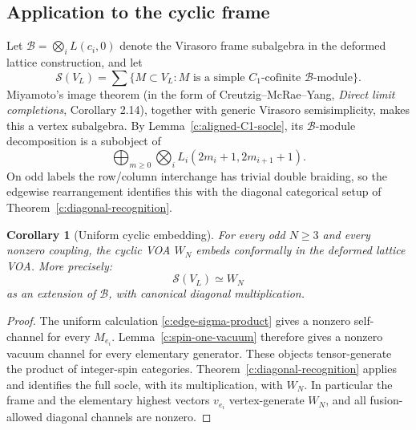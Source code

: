 \documentclass[11pt,a4paper]{article}
\numberwithin{equation}{section}
\newtheorem{corollary}[theorem]{Corollary}
\theoremstyle{definition}\newtheorem{definition}[theorem]{Definition}
\theoremstyle{remark}\newtheorem{remark}[theorem]{Remark}
\begin{document}
\subsection{Application to the cyclic frame}

Let $\mathcal B=\bigotimes_i L(c_i,0)$ denote the Virasoro frame subalgebra
in the deformed lattice construction, and let
\[
 \mathscr S(V_L)=\sum\{M\subset V_L:
              M\text{ is a simple }C_1\text{-cofinite }\mathcal B\text{-module}\}.
\]
Miyamoto's image theorem (in the form of Creutzig--McRae--Yang,
\emph{Direct limit completions}, Corollary 2.14), together with generic
Virasoro semisimplicity, makes this a vertex subalgebra.  By Lemma~\ref{c:aligned-C1-socle},
its $\mathcal B$-module decomposition is a subobject of
\[
 \bigoplus_{m\geq0}\bigotimes_i
                L_i(2m_i+1,2m_{i+1}+1).
\]
On odd labels the row/column interchange has trivial double braiding, so
the edgewise rearrangement identifies this with the diagonal categorical
setup of Theorem~\ref{c:diagonal-recognition}.

\begin{corollary}[Uniform cyclic embedding]\label{c:cyclic-embedding}
For every odd $N\geq3$ and every nonzero coupling, the cyclic VOA
$W_N$ embeds conformally in the deformed lattice VOA. More precisely:
\[
 \mathscr S(V_L)\simeq W_N
\]
as an extension of $\mathcal B$, with canonical diagonal multiplication.
\end{corollary}
\begin{proof}
The uniform calculation \eqref{c:edge-sigma-product} gives a nonzero
self-channel for every $M_{e_i}$. Lemma~\ref{c:spin-one-vacuum} therefore
gives a nonzero vacuum channel for every elementary generator. These
objects tensor-generate the product of integer-spin categories. Theorem~\ref{c:diagonal-recognition}
applies and identifies the full socle, with its multiplication, with $W_N$.
In particular the frame and the elementary highest vectors $v_{e_i}$
vertex-generate $W_N$, and all fusion-allowed diagonal channels are nonzero.
\end{proof}
\end{document}
